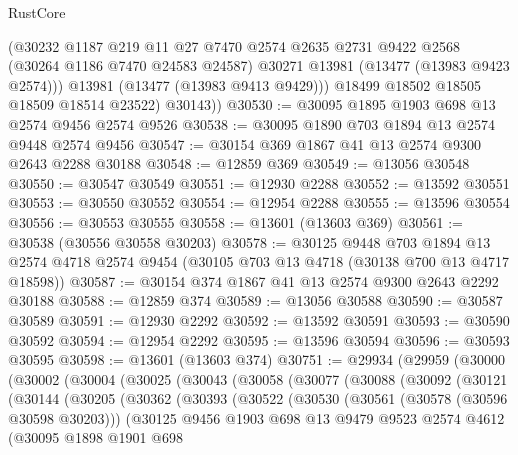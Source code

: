 \begin{lexlean}{RustCore}
\begin{coremodule}
            (@30232
              @1187
              @219
              @11
              @27
              @7470
              @2574
              @2635
              @2731
              @9422
              @2568
              (@30264 @1186 @7470 @24583 @24587)
              @30271
              @13981
              (@13477 (@13983 @9423 @2574)))
            @13981
            (@13477 (@13983 @9413 @9429)))
          @18499
          @18502
          @18505
          @18509
          @18514
          @23522)
        @30143))
@30530 := @30095 @1895 @1903 @698 @13 @2574 @9456 @2574 @9526
@30538 := @30095 @1890 @703 @1894 @13 @2574 @9448 @2574 @9456
@30547 := @30154 @369 @1867 @41 @13 @2574 @9300 @2643 @2288 @30188
@30548 := @12859 @369
@30549 := @13056 @30548
@30550 := @30547 @30549
@30551 := @12930 @2288
@30552 := @13592 @30551
@30553 := @30550 @30552
@30554 := @12954 @2288
@30555 := @13596 @30554
@30556 := @30553 @30555
@30558 := @13601 (@13603 @369)
@30561 := @30538 (@30556 @30558 @30203)
@30578 := @30125
    @9448
    @703
    @1894
    @13
    @2574
    @4718
    @2574
    @9454
    (@30105 @703 @13 @4718 (@30138 @700 @13 @4717 @18598))
@30587 := @30154 @374 @1867 @41 @13 @2574 @9300 @2643 @2292 @30188
@30588 := @12859 @374
@30589 := @13056 @30588
@30590 := @30587 @30589
@30591 := @12930 @2292
@30592 := @13592 @30591
@30593 := @30590 @30592
@30594 := @12954 @2292
@30595 := @13596 @30594
@30596 := @30593 @30595
@30598 := @13601 (@13603 @374)
@30751 := @29934
    (@29959
      (@30000
        (@30002
          (@30004
            (@30025
              (@30043
                (@30058
                  (@30077
                    (@30088
                      (@30092
                        (@30121
                          (@30144
                            (@30205
                              (@30362
                                (@30393
                                  (@30522
                                    (@30530
                                      (@30561 (@30578 (@30596 @30598 @30203)))
                                      (@30125
                                        @9456
                                        @1903
                                        @698
                                        @13
                                        @9479
                                        @9523
                                        @2574
                                        @4612
                                        (@30095
                                          @1898
                                          @1901
                                          @698

\end{coremodule}
\end{lexlean}
